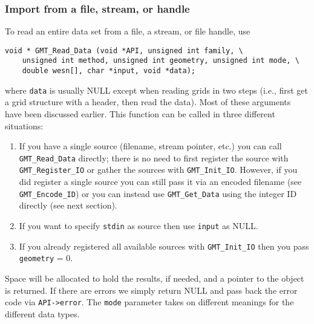 \documentclass[11pt]{report}
\begin{document}
\subsubsection{Import from a file, stream, or handle}
To read an entire data set from a file, a stream, or file handle, use
\begin{verbatim}
void * GMT_Read_Data (void *API, unsigned int family, \
    unsigned int method, unsigned int geometry, unsigned int mode, \
    double wesn[], char *input, void *data);
\end{verbatim}
where \texttt{data} is usually NULL except when reading grids in two steps
(i.e., first get a grid structure with a header, then read the data).
Most of these arguments have been discussed earlier.  This function can
be called in three different situations:
\begin{enumerate}
\item If you have a single source (filename, stream pointer, etc.) you can call
\texttt{GMT\_Read\_Data} directly; there is no need to first register the source
with \texttt{GMT\_Register\_IO} or gather the sources with \texttt{GMT\_Init\_IO}.
However, if you did register a single source you can still pass it via an encoded
filename (see \texttt{GMT\_Encode\_ID}) or you can instead use \texttt{GMT\_Get\_Data}
using the integer ID directly (see next section).
\item If you want to specify \texttt{stdin} as source then use \texttt{input} as NULL.
\item If you already registered all available sources with \texttt{GMT\_Init\_IO} then
you pass \texttt{geometry} = 0.
\end{enumerate}
Space will be allocated to hold the results, if needed, and a pointer to the object is returned.
If there are errors we simply return NULL and pass back the error code via \texttt{API->error}.
The \texttt{mode} parameter takes on different meanings for the different data types.
\end{document}
